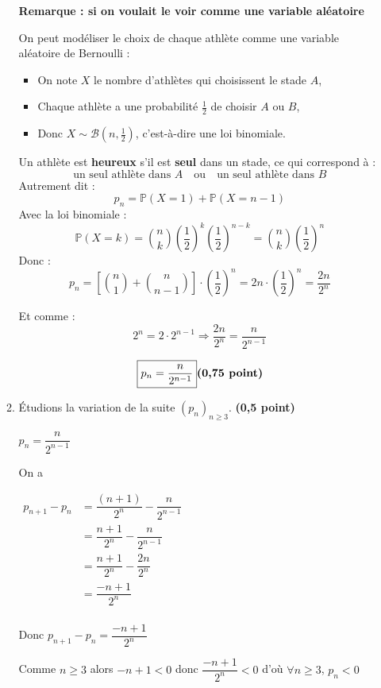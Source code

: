 \documentclass[12pt,a4paper]{article}
\begin{document}
\begin{enumerate}
\begin{enumerate}
\textbf{Remarque : si on voulait le voir comme une variable aléatoire}

\vspace{0.2cm}
On peut modéliser le choix de chaque athlète comme une variable aléatoire de Bernoulli :
\begin{itemize}
    \item On note \( X \) le nombre d’athlètes qui choisissent le stade \( A \),
    \item Chaque athlète a une probabilité \( \frac{1}{2} \) de choisir \( A \) ou \( B \),
    \item Donc \( X \sim \mathcal{B}(n, \frac{1}{2}) \), c’est-à-dire une loi binomiale.
\end{itemize}

Un athlète est \textbf{heureux} s’il est \textbf{seul} dans un stade, ce qui correspond à :
\[
\text{un seul athlète dans } A \quad \text{ou} \quad \text{un seul athlète dans } B
\]
Autrement dit :
\[
p_n = \mathbb{P}(X = 1) + \mathbb{P}(X = n - 1)
\]
Avec la loi binomiale :
\[
\mathbb{P}(X = k) = \binom{n}{k} \left( \frac{1}{2} \right)^k \left( \frac{1}{2} \right)^{n - k} = \binom{n}{k} \left( \frac{1}{2} \right)^n
\]
Donc :
\[
p_n = \left[ \binom{n}{1} + \binom{n}{n - 1} \right] \cdot \left( \frac{1}{2} \right)^n = 2n \cdot \left( \frac{1}{2} \right)^n = \frac{2n}{2^n}
\]

Et comme :
\[
2^n = 2 \cdot 2^{n - 1} \Rightarrow \frac{2n}{2^n} = \frac{n}{2^{n - 1}}
\]
    
\[
\boxed{ p_n = \dfrac{n}{2^{n-1}} } \hfill \textbf{(0,75 point)}
\]

\item Étudions la variation de la suite \( (p_n)_{n \geq 3} \). \hfill \textbf{(0,5 point)}

		\( p_n = \dfrac{n}{2^{n-1}} \)
		
		On a 
		
		\(
		\begin{aligned}
		p_{n+1} - p_n &= \dfrac{(n+1)}{2^{n}} - \dfrac{n}{2^{n-1}}\\
									&= \dfrac{n+1}{2^{n}} - \dfrac{n}{2^{n-1}}\\
									&= \dfrac{n+1}{2^{n}} - \dfrac{2n}{2^{n}}\\
									&= \dfrac{-n+1}{2^{n}}\\
		\end{aligned}
		\)

Donc $p_{n+1} - p_n = \dfrac{-n+1}{2^{n}}$

Comme $n \geq 3$ alors $-n+1 < 0$ donc $\dfrac{-n+1}{2^{n} } < 0$ d'où $\forall n \geq 3$, $p_n <0$


\end{enumerate}
\end{enumerate}
\end{document}
